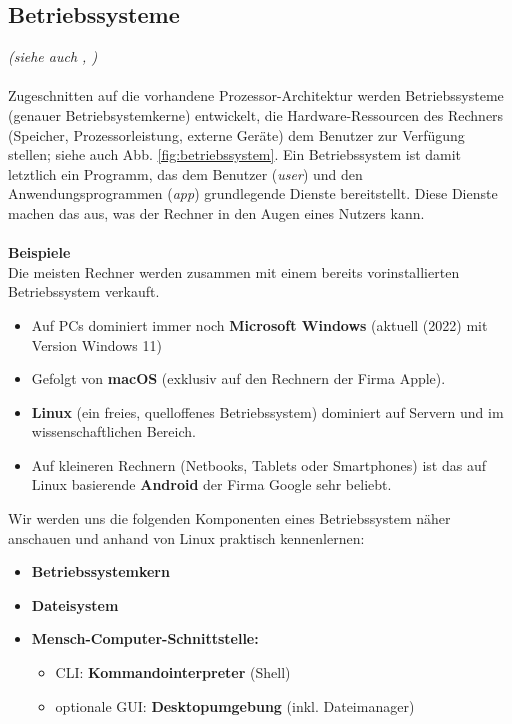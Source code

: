 \subsection{Betriebssysteme} 
\textit{\small(siehe auch \cite[Kap. 2]{gumm2}, \cite[Kap. 6 ]{gumm3})}\\~\\
Zugeschnitten auf die vorhandene Prozessor-Architektur werden Betriebssysteme (genauer Betriebsystemkerne) entwickelt, die Hardware-Ressourcen des Rechners (Speicher, Prozessorleistung, externe Geräte) dem Benutzer zur Verfügung stellen; siehe auch Abb. \ref{fig:betriebssystem}.
Ein Betriebssystem ist damit letztlich ein Programm, das dem Benutzer (\textit{user}) und den Anwendungsprogrammen (\textit{app}) grundlegende Dienste bereitstellt. Diese Dienste  machen das aus, was der Rechner in den Augen eines Nutzers kann.\\
~\\
\textbf{Beispiele}\\
Die meisten Rechner werden zusammen mit einem bereits vorinstallierten Betriebssystem verkauft. 
\begin{itemize}
	\item Auf PCs dominiert immer noch \textbf{Microsoft Windows} (aktuell (2022) mit Version Windows 11)
	\item Gefolgt von \textbf{macOS} (exklusiv auf den Rechnern der Firma Apple).
	\item \textbf{Linux} (ein freies, quelloffenes Betriebssystem) dominiert auf Servern und im wissenschaftlichen Bereich.
	\item Auf kleineren Rechnern (Netbooks, Tablets oder Smartphones) ist das auf Linux basierende \textbf{Android} der Firma Google sehr beliebt. 
\end{itemize} 
Wir werden uns die folgenden Komponenten eines Betriebssystem näher anschauen und anhand von Linux praktisch kennenlernen:
\begin{itemize}
	\item \textbf{Betriebssystemkern}
	\item \textbf{Dateisystem}
	\item \textbf{Mensch-Computer-Schnittstelle:}
	\begin{itemize}
		\item CLI: \textbf{Kommandointerpreter} (Shell)
		\item optionale GUI: \textbf{Desktopumgebung} (inkl. Dateimanager)
	\end{itemize}
\end{itemize}

